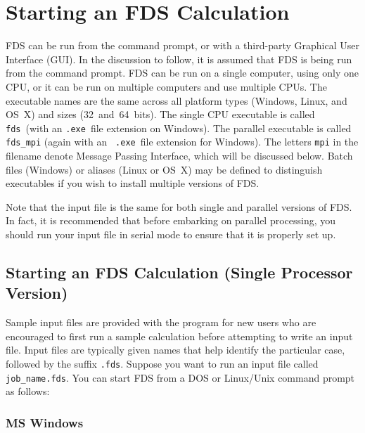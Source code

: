 \documentclass[11pt]{book}
\newcommand{\ct}{\tt\small}
\begin{document}
\section{Starting an FDS Calculation}

FDS can be run from the command prompt, or with a third-party
Graphical User Interface (GUI). In the discussion to follow, it is
assumed that FDS is being run from the command prompt. FDS can be
run on a single computer, using only one CPU, or it can be run on
multiple computers and use multiple CPUs. The executable names are
the same across all platform types (Windows, Linux, and OS~X) and
sizes (32~and~64~bits). The single CPU executable is called {\ct
fds}\ (with an {\ct .exe}\ file extension on Windows).  The
parallel executable is called {\ct fds\_mpi} (again with an {\ct
.exe}\ file extension for Windows). The letters {\ct mpi} in the
filename denote Message Passing Interface, which will be discussed
below.  Batch files (Windows) or aliases (Linux or OS~X) may be
defined to distinguish executables if you wish to install multiple
versions of FDS.

\begin{warning}
\noindent
Note that the input file is the same for both single and parallel versions of FDS.
In fact, it is recommended that before embarking on parallel processing, you should run your input
file in serial mode to ensure that it is properly set up.
\end{warning}


\subsection{Starting an FDS Calculation (Single Processor Version)}

Sample input files are provided with the program for new users who
are encouraged to first run a sample calculation before attempting to
write an input file. Input files are typically given names that help identify the particular case, followed by the
suffix {\ct .fds}. Suppose you want to run an input file called {\ct job\_name.fds}.
You can start FDS from a DOS or Linux/Unix command prompt as follows:


\subsubsection{MS Windows}
\end{document}
